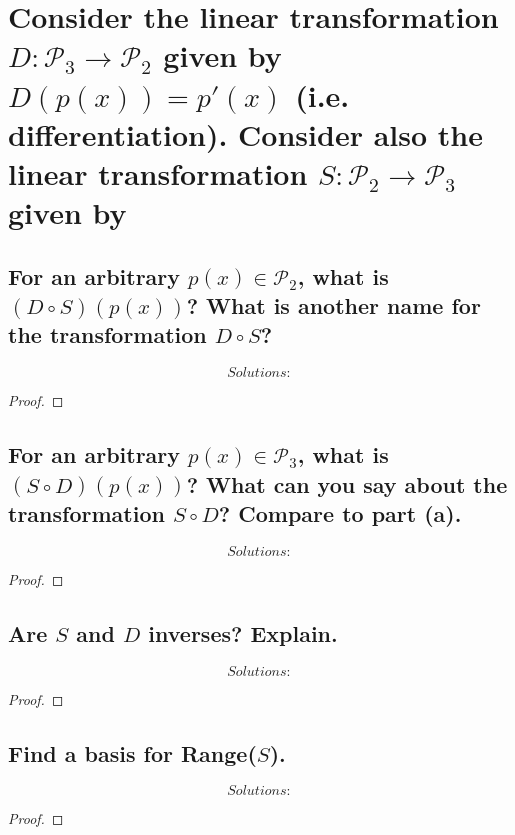 \documentclass[../main.tex]{subfiles}
\begin{document}
\section[Problem 4]{Consider the linear transformation $D: \mathcal{P}_3 \to \mathcal{P}_2$ given by $D(p(x)) = p'(x)$ (i.e. differentiation). Consider also the linear transformation $S: \mathcal{P}_2 \to \mathcal{P}_3$ given by }
\subsection{For an arbitrary $p(x) \in \mathcal{P}_2$, what is $(D \circ S)(p(x))$? What is another name for the transformation $D \circ S$?}
\begin{equation*}
        \boxed{ Solutions:}
\end{equation*}
\begin{proof}
\end{proof}
\pagebreak
\subsection{For an arbitrary $p(x) \in \mathcal{P}_3$, what is $(S \circ D)(p(x))$? What can you say about the transformation $S \circ D$? Compare to part (a).}
\begin{equation*}
        \boxed{ Solutions:}
\end{equation*}
\begin{proof}
\end{proof}
\subsection{Are $S$ and $D$ inverses? Explain.}
\begin{equation*}
        \boxed{ Solutions:}
\end{equation*}
\begin{proof}
\end{proof}
\subsection{Find a basis for Range($S$).}
\begin{equation*}
        \boxed{ Solutions:}
\end{equation*}
\begin{proof}
\end{proof}
\end{document}
